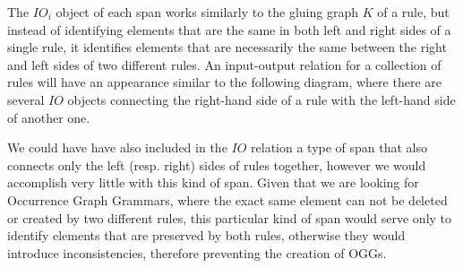 The $IO_i$ object of each span works similarly to the gluing graph $K$ of a rule, but instead of identifying elements that are the same in both left and right sides of a single rule, it identifies elements that are necessarily the same between the right and left sides of two different rules. An input-output relation for a collection of rules will have an appearance similar to the following diagram, where there are several $IO$ objects connecting the right-hand side of a rule with the left-hand side of another one.



\begin{remark}We could have have also included in the $IO$ relation a type of span that also connects only the left (resp. right) sides of rules together, however we would accomplish very little with this kind of span. Given that we are looking for Occurrence Graph Grammars, where the exact same element can not be deleted or created by two different rules, this particular kind of span would serve only to identify elements that are preserved by both rules, otherwise they would introduce inconsistencies, therefore preventing the creation of OGGs.
\end{remark}

